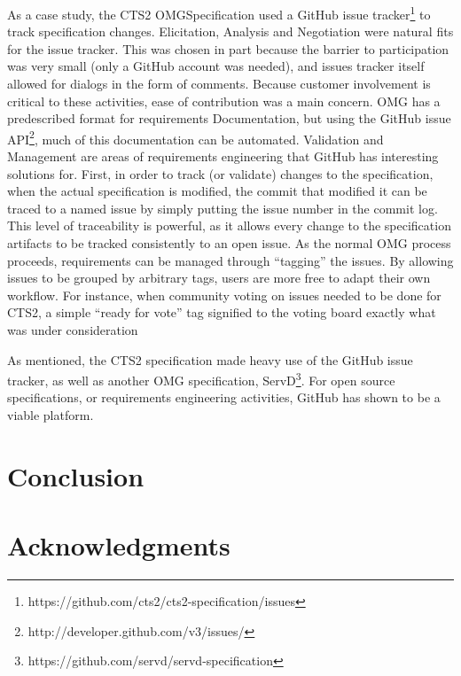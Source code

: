 \documentclass{proc}
\begin{document}
As a case study, the CTS2 OMG\textregistered Specification\cite{cts2} used a GitHub issue tracker\footnote{https://github.com/cts2/cts2-specification/issues} to track specification changes. Elicitation, Analysis and Negotiation were natural fits for the issue tracker. This was chosen in part because the barrier to participation was very small (only a GitHub account was needed), and issues tracker itself allowed for dialogs in the form of comments. Because customer involvement is critical to these activities\cite{paetsch2003requirements}, ease of contribution was a main concern. OMG has a predescribed format for requirements Documentation, but using the GitHub issue API\footnote{http://developer.github.com/v3/issues/}, much of this documentation can be automated.
Validation and Management are areas of requirements engineering that GitHub has interesting solutions for. First, in order to track (or validate) changes to the specification, when the actual specification is modified, the commit that modified it can be traced to a named issue by simply putting the issue number in the commit log. This level of traceability is powerful, as it allows every change to the specification artifacts to be tracked consistently to an open issue. As the normal OMG process proceeds, requirements can be managed through ``tagging'' the issues. By allowing issues to be grouped by arbitrary tags, users are more free to adapt their own workflow. For instance, when community voting on issues needed to be done for CTS2, a simple ``ready for vote'' tag signified to the voting board exactly what was under consideration

As mentioned, the CTS2 specification made heavy use of the GitHub issue tracker, as well as another OMG specification, ServD\footnote{https://github.com/servd/servd-specification}. For open source specifications, or requirements engineering activities, GitHub has shown to be a viable platform. 

\section{Conclusion}

\section{Acknowledgments}



\end{document}
